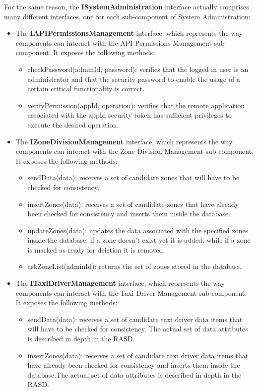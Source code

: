 For the same reason, the \textbf{ISystemAdministration} interface actually comprises many different interfaces, one for each sub-component of System Administration:
\begin{itemize}
	\item The \textbf{IAPIPermissionsManagement} interface, which represents the way components can interact with the API Permissions Management sub-component. It exposes the following methods:
	\begin{itemize}
	\item checkPassword(adminId, password): verifies that the logged in user is an administrator and that the security password to enable the usage of a certain critical functionality is correct.
	\item verifyPermission(appId, operation): verifies that the remote application associated with the appId security token has sufficient privileges to execute the desired operation.
	\end{itemize}
	\item The \textbf{IZoneDivisionManagement} interface, which represents the way components can interact with the Zone Division Management sub-component. It exposes the following methods:
	\begin{itemize}
	\item sendData(data): receives a set of candidate zones that will have to be checked for consistency.
	\item insertZones(data): receives a set of candidate zones that have already been checked for consistency and inserts them inside the database.
	\item updateZones(data): updates the data associated with the specified zones inside the database; if a zone doesn't exist yet it is added, while if a zone is marked as ready for deletion it is removed.
	\item askZoneList(adminId): returns the set of zones stored in the database. 
	\end{itemize}
	\item The \textbf{ITaxiDriverManagement} interface, which represents the way components can interact with the Taxi Driver Management sub-component. It exposes the following methods:
	\begin{itemize}
	\item sendData(data): receives a set of candidate taxi driver data items that will have to be checked for consistency. The actual set of data attributes is described in depth in the RASD.
	\item insertZones(data): receives a set of candidate taxi driver data items that have already been checked for consistency and inserts them inside the database.The actual set of data attributes is described in depth in the RASD.

\end{itemize}
\end{itemize}
